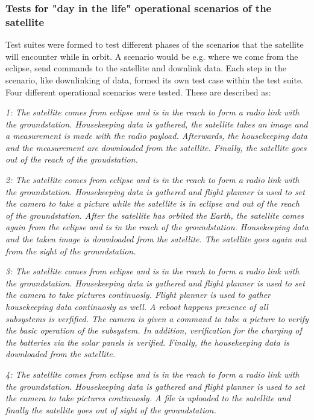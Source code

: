 \documentclass[english,12pt,a4paper,pdftex,elec,utf8]{aaltothesis}
\begin{document}
\subsubsection{Tests for "day in the life" operational scenarios of the satellite}
Test suites were formed to test different phases of the scenarios that the satellite will encounter while in orbit. A scenario would be e.g. where we come from the eclipse, send commands to the satellite and downlink data. Each step in the scenario, like downlinking of data, formed its own test case within the test suite. 
Four different operational scenarios were tested. These are described as:
\\
\par 
\textit{1: The satellite comes from eclipse and is in the reach to form a radio link with the groundstation. Housekeeping data is gathered, the satellite takes an image and a measurement is made with the radio payload. Afterwards, the housekeeping data and the measurement are downloaded from the satellite. Finally, the satellite goes out of the reach of the groudstation.}
\\
\par 
\textit{2: The satellite comes from eclipse and is in the reach to form a radio link with the groundstation. Housekeeping data is gathered and flight planner is used to set the camera to take a picture while the satellite is in eclipse and out of the reach of the groundstation. After the satellite has orbited the Earth, the satellite comes again from the eclipse and is in the reach of the groundstation. Housekeeping data and the taken image is downloaded from the satellite. The satellite goes again out from the sight of the groundstation.}
\\
\par 
\textit{3: The satellite comes from eclipse and is in the reach to form a radio link with the groundstation. Housekeeping data is gathered and flight planner is used to set the camera to take pictures continuosly. Flight planner is used to gather housekeeping data continuosly as well. A reboot happens presence of all subsystems is verfified. The camera is given a command to take a picture to verify the basic operation of the subsystem. In addition, verification for the charging of the batteries via the solar panels is verified. Finally, the housekeeping data is downloaded from the satellite.}
\\
\par 
\textit{4: The satellite comes from eclipse and is in the reach to form a radio link with the groundstation. Housekeeping data is gathered and flight planner is used to set the camera to take pictures continuosly. A file is uploaded to the satellite and finally the satellite goes out of sight of the groundstation.}\\
\end{document}
